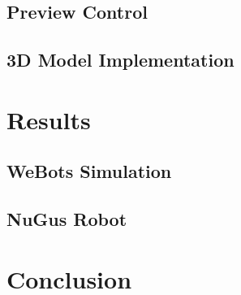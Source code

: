 \documentclass{UoNMCHA}
\begin{document}
		\subsection{Preview Control}
			
		\subsection{3D Model Implementation}\label{sec:ZMP_imp}
			
	
	\newpage\section{Results}\label{sec:Results}
		
		\subsection{WeBots Simulation}
			
		\subsection{NuGus Robot}
			
	
	\clearpage
	\newpage\section{Conclusion}\label{sec:Conclusion}
		

	\newpage %
		
\end{document}
